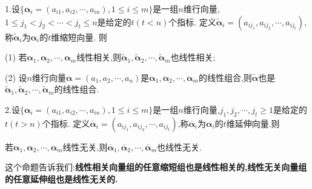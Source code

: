 \documentclass[lang=cn,newtx,10pt,scheme=chinese]{elegantbook}
\begin{document}
\begin{proposition}[缩短向量与延伸向量]\label{proposition:线性相关向量组的缩短组也线性相关}
1.设\(\{\boldsymbol{\alpha}_i=(a_{i1},a_{i2},\cdots,a_{in}),1\leq i\leq m\}\)是一组\(n\)维行向量,\(1\leq j_1<j_2<\cdots<j_t\leq n\)是给定的\(t(t < n)\)个指标. 定义\(\widetilde{\boldsymbol{\alpha}}_i=(a_{ij_1},a_{ij_2},\cdots,a_{ij_t})\),称\(\widetilde{\boldsymbol{\alpha}}_i\)为\(\boldsymbol{\alpha}_i\)的\(t\)维缩短向量. 则

(1) 若\(\boldsymbol{\alpha}_1,\boldsymbol{\alpha}_2,\cdots,\boldsymbol{\alpha}_m\)线性相关,则\(\widetilde{\boldsymbol{\alpha}}_1,\widetilde{\boldsymbol{\alpha}}_2,\cdots,\widetilde{\boldsymbol{\alpha}}_m\)也线性相关;

(2) 设\(n\)维行向量\(\boldsymbol{\alpha}=(a_1,a_2,\cdots,a_n)\)是\(\boldsymbol{\alpha}_1,\boldsymbol{\alpha}_2,\cdots,\boldsymbol{\alpha}_m\)的线性组合,则\(\widetilde{\boldsymbol{\alpha}}\)也是\(\widetilde{\boldsymbol{\alpha}}_1,\widetilde{\boldsymbol{\alpha}}_2,\cdots,\widetilde{\boldsymbol{\alpha}}_m\)的线性组合.

2.设\(\{\boldsymbol{\alpha}_i=(a_{i1},a_{i2},\cdots,a_{in}),1\leq i\leq m\}\)是一组\(n\)维行向量,\(j_1,j_2,\cdots,j_t\geq 1\)是给定的\(t(t > n)\)个指标. 定义\(\overline{\boldsymbol{\alpha}}_i=(a_{ij_1},a_{ij_2},\cdots,a_{ij_t})\),称\(\overline{\boldsymbol{\alpha}}_i\)为\(\boldsymbol{\alpha}_i\)的\(t\)维延伸向量.则

若\(\boldsymbol{\alpha}_1,\boldsymbol{\alpha}_2,\cdots,\boldsymbol{\alpha}_m\)线性无关,则\(\overline{\boldsymbol{\alpha}}_1,\overline{\boldsymbol{\alpha}}_2,\cdots,\overline{\boldsymbol{\alpha}}_m\)也线性无关.
\end{proposition}
\begin{note}
    这个命题告诉我们:\textbf{线性相关向量组的任意缩短组也是线性相关的,线性无关向量组的任意延伸组也是线性无关的.}
\end{note}
\end{document}
